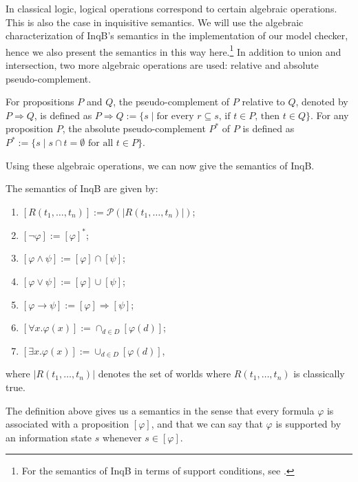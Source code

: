 In classical logic, logical operations correspond to certain algebraic operations. This is also the case in inquisitive semantics. We will use the algebraic characterization of \textsf{InqB}'s semantics in the implementation of our model checker, hence we also present the semantics in this way here.\footnote{For the semantics of \textsf{InqB} in terms of support conditions, see \cite[p.\ 62-63]{inquisitive19}.} In addition to union and intersection, two more algebraic operations are used: relative and absolute pseudo-complement.

\begin{defi}
 For propositions $P$ and $Q$, the pseudo-complement of $P$ relative to $Q$, denoted by $P\Rightarrow Q$, is defined as $P\Rightarrow Q:= \{s \mid \text{for every } r\subseteq s\text{, if } t\in P\text{, then } t\in Q\}$. For any proposition $P$, the absolute pseudo-complement $P^*$ of $P$ is defined as $P^*:=\{s\mid s\cap t=\emptyset \text{ for all } t\in P\}$.
\end{defi}
Using these algebraic operations, we can now give the semantics of \textsf{InqB}.

\begin{defi}\label{defsemantics}
 The semantics of \textsf{InqB} are given by:
 \begin{enumerate}\setlength\itemsep{-0.3em}
     \item $[R(t_1,\dots,t_n)] := \mathcal{P}(|R(t_1,\dots,t_n)|)$;
     \item $[\neg \varphi]:=[\varphi]^*$;
     \item $[\varphi\land\psi]:=[\varphi]\cap [\psi]$;
     \item $[\varphi\lor\psi]:=[\varphi]\cup [\psi]$;
     \item $[\varphi\rightarrow\psi]:=[\varphi]\Rightarrow [\psi]$;
     \item $[\forall x . \varphi(x)]:= \cap_{d\in D} [\varphi(d)]$;
     \item $[\exists x . \varphi(x)]:= \cup_{d\in D} [\varphi(d)]$,
 \end{enumerate}
 where $|R(t_1,\dots,t_n)|$ denotes the set of worlds where $R(t_1,\dots,t_n)$ is classically true.
\end{defi}

The definition above gives us a semantics in the sense that every formula $\varphi$ is associated with a proposition $[\varphi]$, and that we can say that $\varphi$ is supported by an information state $s$ whenever $s\in [\varphi]$.

